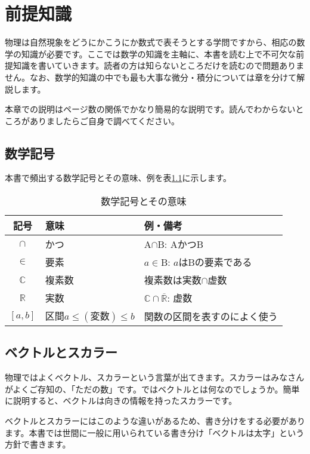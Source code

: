 \chapter{前提知識}
\label{premise}
物理は自然現象をどうにかこうにか数式で表そうとする学問ですから、相応の数学の知識が必要です。ここでは数学の知識を主軸に、本書を読む上で不可欠な前提知識を書いていきます。読者の方は知らないところだけを読むので問題ありません。なお、数学的知識の中でも最も大事な微分・積分については章を分けて解説します。

本章での説明はページ数の関係でかなり簡易的な説明です。読んでわからないところがありましたらご自身で調べてください。

\section{数学記号}
\label{math}
本書で頻出する数学記号とその意味、例を表\ref{tab:math}に示します。

\begin{table}[htb]
 \begin{center}
  \caption{数学記号とその意味}
  \label{tab:math}
  \begin{tabular}{c|l|l}
    \hline
    記号 & 意味 & 例・備考\\
    \hline\hline
    $\cap$ & かつ & A$\cap$B: AかつB\\
    $\in$ & 要素 & $a\in$B: $a$はBの要素である \\
    $\mathbb{C}$ & 複素数 & 複素数は実数$\cap$虚数\\
    $\mathbb{R}$ & 実数 & $\mathbb{C}\cap\overline{\mathbb{R}}$: 虚数\\
    $[a,b]$ & 区間$a\leq (変数)\leq b$ & 関数の区間を表すのによく使う\\
    
  \end{tabular}
 \end{center}
\end{table}



\section{ベクトルとスカラー}
\label{vector}
物理ではよくベクトル、スカラーという言葉が出てきます。スカラーはみなさんがよくご存知の、「ただの数」です。ではベクトルとは何なのでしょうか。簡単に説明すると、ベクトルは向きの情報を持ったスカラーです。

ベクトルとスカラーにはこのような違いがあるため、書き分けをする必要があります。本書では世間に一般に用いられている書き分け「ベクトルは太字」という方針で書きます。

